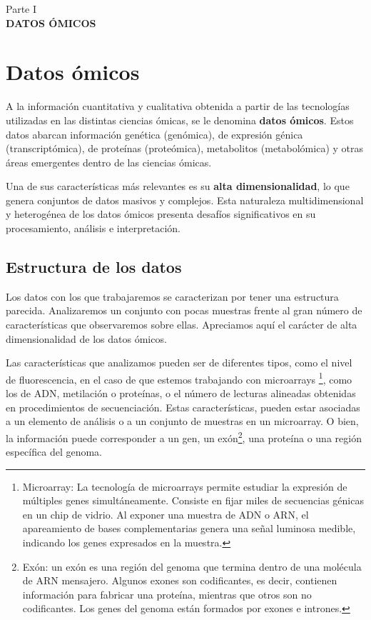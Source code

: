 \newpage
\thispagestyle{empty}
\vspace*{\fill}
\begin{center}
    \large Parte I \\
    \vspace{0.5cm}           
    \LARGE \textbf{DATOS ÓMICOS}
\end{center}
\vspace*{\fill}
\newpage
\setcounter{page}{1}  %

\newpage


\chapter{Datos ómicos}

A la información cuantitativa y cualitativa obtenida a partir de las tecnologías utilizadas
en las distintas ciencias ómicas, se le denomina \textbf{datos ómicos}. Estos datos abarcan 
información genética (genómica), de expresión génica (transcriptómica), de proteínas (proteómica),
metabolitos (metabolómica) y otras áreas emergentes dentro de las ciencias ómicas.

Una de sus características más relevantes es su \textbf{alta dimensionalidad}, lo que genera conjuntos de datos 
masivos y complejos. Esta naturaleza multidimensional y heterogénea de los datos ómicos presenta 
desafíos significativos en su procesamiento, análisis e interpretación.

\section{Estructura de los datos}

Los datos con los que trabajaremos se caracterizan por tener una estructura parecida. Analizaremos un
conjunto con pocas muestras frente al gran número de características que observaremos sobre ellas. Apreciamos
aquí el carácter de alta dimensionalidad de los datos ómicos. \newline

Las características que analizamos pueden ser de diferentes tipos, como el nivel de fluorescencia, en el caso
de que estemos trabajando con microarrays \footnote[1]{Microarray: La tecnología de microarrays permite estudiar 
la expresión de múltiples genes simultáneamente. Consiste en fijar miles de secuencias génicas en un chip de vidrio. 
Al exponer una muestra de ADN o ARN, el apareamiento de bases complementarias genera una señal luminosa medible, 
indicando los genes expresados en la muestra.}, como los de ADN, metilación o proteínas, o el número de lecturas 
alineadas obtenidas en procedimientos de secuenciación. Estas características, pueden estar asociadas a un
elemento de análisis o a un conjunto de muestras en un microarray. O bien, la información puede corresponder a
un gen, un exón\footnote[2]{Exón: un exón es una región del genoma que termina dentro de una molécula de ARN mensajero.
Algunos exones son codificantes, es decir, contienen información para fabricar una proteína, mientras que otros 
son no codificantes. Los genes del genoma están formados por exones e intrones.},
una proteína o una región específica del genoma. \newline

